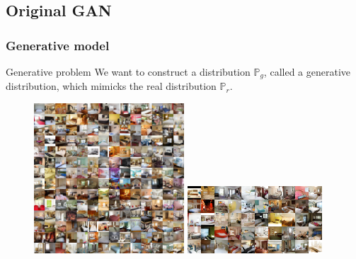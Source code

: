 \documentclass[french,9pt]{beamer}
\begin{document}
\subsection{Original GAN \cite{googfellow2014}}

\begin{frame}
\frametitle{Generative model}

\begin{block}{Generative problem}
We want to construct a distribution $\mathbb{P}_{g}$, called a generative distribution, which mimicks the real distribution $\mathbb{P}_{r}$.
\end{block}

\begin{figure}
  \begin{center}
    \includegraphics[width=0.5\textwidth]{fig/lsun_bedrooms_real.png}\hspace{1mm}
     \includegraphics[width=0.45\textwidth]{fig/lsun_bedrooms_five_epoch_samples.png}\hspace{1mm}
  \end{center}
  \caption{\cite{2015arXiv151106434R}}
\end{figure}

\end{frame}
\end{document}
